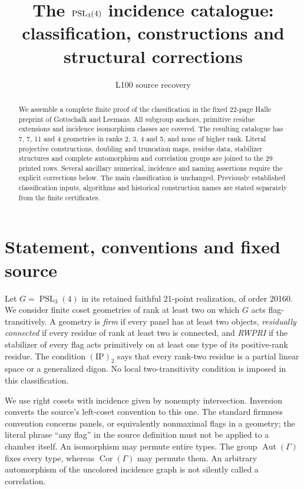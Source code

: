 \documentclass[11pt]{article}
\title{The $\PSL_3(4)$ incidence catalogue: classification, constructions and structural corrections}
\author{L100 source recovery}\date{}
\newcommand{\Aut}{\operatorname{Aut}}\newcommand{\Cor}{\operatorname{Cor}}
\newcommand{\PSL}{\operatorname{PSL}}\newcommand{\PG}{\operatorname{PG}}
\newcommand{\ip}{\mathrm{(IP)}_2}
\begin{document}
\maketitle
\begin{abstract}
We assemble a complete finite proof of the classification in the fixed
22-page Halle preprint of Gottschalk and Leemans. All subgroup anchors,
primitive residue extensions and incidence isomorphism classes are covered.
The resulting catalogue has 7, 7, 11 and 4 geometries in ranks 2, 3, 4 and 5,
and none of higher rank. Literal projective constructions, doubling and
truncation maps, residue data, stabilizer structures and complete
automorphism and correlation groups are joined to the 29 printed rows.
Several ancillary numerical, incidence and naming assertions require
the explicit corrections below. The main classification is unchanged.
Previously established classification inputs, algorithms and historical
construction names are stated separately from the finite certificates.
\end{abstract}

\section{Statement, conventions and fixed source}
Let $G=\PSL_3(4)$ in its retained faithful 21-point realization, of order
20160. We consider finite coset geometries of rank at least two on which
$G$ acts flag-transitively. A geometry is \emph{firm} if every panel has
at least two objects, \emph{residually connected} if every residue of
rank at least two is connected, and \emph{RWPRI} if the stabilizer of
every flag acts primitively on at least one type of its positive-rank
residue. The condition $\ip$ says that every rank-two residue is a
partial linear space or a generalized digon. No local two-transitivity
condition is imposed in this classification.

We use right cosets with incidence given by nonempty intersection.
Inversion converts the source's left-coset convention to this one.
The standard firmness convention concerns panels, or equivalently
nonmaximal flags in a geometry; the literal phrase ``any flag'' in the
source definition must not be applied to a chamber itself. An isomorphism
may permute entire types. The group $\Aut(\Gamma)$ fixes every type,
whereas $\Cor(\Gamma)$ may permute them. An arbitrary automorphism of
the uncolored incidence graph is not silently called a correlation.
\end{document}
